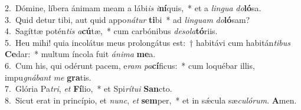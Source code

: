 {2.~}Dómine, líbera ánimam meam a lábi\textit{is} \textit{i}\textbf{ní}quis,~* et a \textit{lin}\textit{gua} \textit{do}\textbf{ló}sa.\\
{3.~}Quid detur tibi, aut quid appo\textit{ná}\textit{tur} \textbf{ti}bi~* ad \textit{lin}\textit{guam} \textit{do}\textbf{ló}sam?\\
{4.~}Sagíttæ potén\textit{tis} \textit{a}\textbf{cú}tæ,~* cum carbónibus \textit{de}\textit{so}\textit{la}\textbf{tó}riis.\\
{5.~}Heu mihi! quia incolátus meus prolongátus est:~† habitávi cum habitán\textit{ti}\textit{bus} \textbf{Ce}dar:~* multum íncola fuit \textit{á}\textit{ni}\textit{ma} \textbf{me}a.\\
{6.~}Cum his, qui odérunt pacem, e\textit{ram} \textit{pa}\textbf{cí}ficus:~* cum loquébar illis, impu\textit{gná}\textit{bant} \textit{me} \textbf{gra}tis.\\
{7.~}Glória Pa\textit{tri}, \textit{et} \textbf{Fí}lio,~* et Spi\textit{rí}\textit{tu}\textit{i} \textbf{San}cto.\\
{8.~}Sicut erat in princípio, et \textit{nunc}, \textit{et} \textbf{sem}per,~* et in sǽcula sæ\textit{cu}\textit{ló}\textit{rum}. \textbf{A}men.\\
